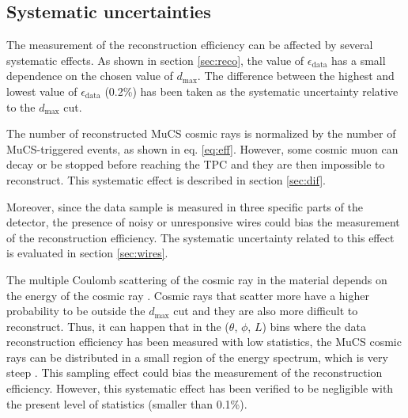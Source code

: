 \documentclass[a4paper,11pt]{article}
\begin{document}
\subsection{Systematic uncertainties}
The measurement of the reconstruction efficiency can be affected by several systematic effects.
As shown in section \ref{sec:reco}, the value of $\epsilon_{\mathrm{data}}$ has a small dependence on the chosen value of $d_{\mathrm{max}}$. The difference between the highest and lowest value of $\epsilon_{\mathrm{data}}$ (0.2\%) has been taken as the systematic uncertainty relative to the $d_{\mathrm{max}}$ cut.

The number of reconstructed MuCS cosmic rays is normalized by the number of MuCS-triggered events, as shown in eq. \eqref{eq:eff}. However, some cosmic muon can decay or be stopped before reaching the TPC and they are then impossible to reconstruct. This systematic effect is described in section \ref{sec:dif}.

Moreover, since the data sample is measured in three specific parts of the detector, the presence of noisy or unresponsive wires could bias the measurement of the reconstruction efficiency. The systematic uncertainty related to this effect is evaluated in section \ref{sec:wires}.

The multiple Coulomb scattering of the cosmic ray in the material depends on the energy of the cosmic ray \cite{pdg}. Cosmic rays that scatter more have a higher probability to be outside the $d_{\mathrm{max}}$ cut and they are also more difficult to reconstruct. Thus, it can happen that in the ($\theta$, $\phi$, $L$) bins where the data reconstruction efficiency has been measured with low statistics, the MuCS cosmic rays can be distributed in a small region of the energy spectrum, which is very steep \cite{corsika}. This sampling effect could bias the measurement of the reconstruction efficiency. However,  this systematic effect has been verified to be negligible with the present level of statistics (smaller than 0.1\%).
\end{document}
